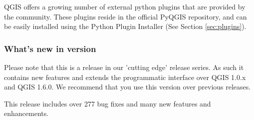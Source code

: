
QGIS offers a growing number of external python plugins that are provided by
the community. These plugins reside in the official PyQGIS repository, and
can be easily installed using the Python Plugin Installer (See Section
\ref{sec:plugins}).

\subsubsection{What's new in version \CURRENT} 

Please note that this is a release in our 'cutting edge' release series. As such 
it contains new features and extends the programmatic interface over QGIS 1.0.x 
and QGIS 1.6.0. We recommend that you use this version over previous releases.

This release includes over 277 bug fixes and many new features and enhancements.


